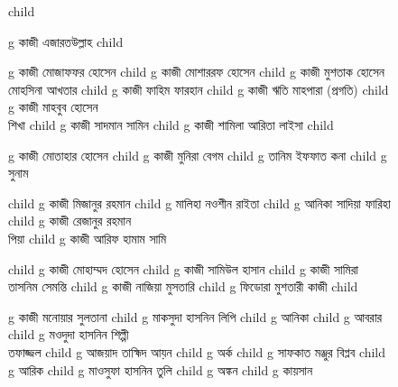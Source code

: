 \documentclass{article}
\begin{document}
\begin{figure}
{\begin{genealogypicture}
{{{{{        }
      }
        child{
        g{ কাজী এজারতউল্লাহ  }
          child{    g{ কাজী মোজাফফর হোসেন }
              child{
                g{ কাজী মোশাররফ হোসেন }
                  child{    g{ কাজী মুশতাক হোসেন \\
                  {\color{spous-color} মোহসিনা আখতার } 
                  }
                    child{    g{ কাজী ফাহিম ফারহান }   }
                    child{    g{ কাজী ঋতি মাহপারা (প্রগতি) }   }
                  }
                  child{    g{ কাজী মাহবুব হোসেন \\
                    {\color{spous-color} শিখা } 
                  }
                    child{    g{ কাজী সাদমান সামিন  }   }
                    child{    g{ কাজী শামিলা আরিতা লাইসা }   }
                  }
              }
              child{
              g{ কাজী মোতাহার হোসেন  }
              child{    g{ কাজী মুনিরা বেগম } 
                    child{ g{ তানিম ইফফাত কনা }  }
                    child{ g{ সুনাম }  }
              }
              
              child{    g{ কাজী মিজানুর রহমান }  
                  child{    g{ মালিহা নওশীন রাইতা    }   }
                  child{    g{ আনিকা সাদিয়া ফারিহা }   }
              }
              child{    g{ কাজী রেজানুর রহমান \\ {\color{spous-color} পিয়া  } } 
                  child{    g{ কাজী আরিফ হামাম সামি }   }
              }
            }
            child{
              g{ কাজী মোহাম্মদ হোসেন }
              child{    g{ কাজী সামিউল হাসান  } 
                child{ g{ কাজী সামিরা তাসনিম সেমন্তি }  }
                }
              child{    g{ কাজী নাজিয়া মুসতারি }
              child{ g{ ফিডোরা মুশতারী কাজী  }  }
              }
            }
            child{
              g{ কাজী মনোয়ার সুলতানা }
                child{ g{ মাকসুদা হাসনিন লিপি }
                  child{ g{ আনিকা }  }
                  child{ g{ আবরার }  }
                }
                child{ g{ মওদুদা হাসনিন শিল্পী \\ {\color{spous-color} তফাজ্জল } }
                    child{ g{ আজয়াদ তাহ্মিদ আয়ন   }  }
                    child{ g{ অর্ক }  }
                  }
                child{ g{ সাফকাত মঞ্জুর বিপ্লব } 
                child{ g{ আরিক }  }
                }
                child{ g{ মাওসুফা হাসনিন তুলি }
                  child{ g{ অঙ্কন }  }
                  child{ g{ কায়সান }  }
                }

}}}}}}
\end{genealogypicture}}
\end{figure}
\end{document}
